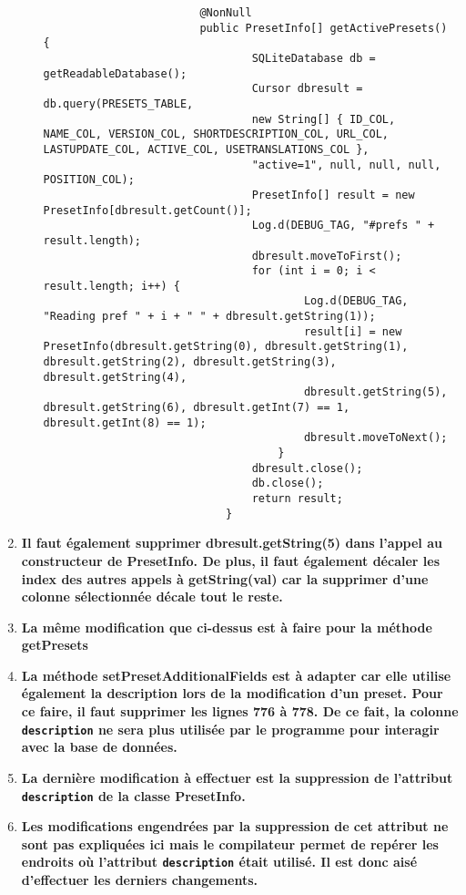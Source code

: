 \begin{enumerate}
\begin{itemize}
\begin{verbatim}
                        @NonNull
                        public PresetInfo[] getActivePresets() {
                                SQLiteDatabase db = getReadableDatabase();
                                Cursor dbresult = db.query(PRESETS_TABLE,
                                new String[] { ID_COL, NAME_COL, VERSION_COL, SHORTDESCRIPTION_COL, URL_COL, LASTUPDATE_COL, ACTIVE_COL, USETRANSLATIONS_COL },
                                "active=1", null, null, null, POSITION_COL);
                                PresetInfo[] result = new PresetInfo[dbresult.getCount()];
                                Log.d(DEBUG_TAG, "#prefs " + result.length);
                                dbresult.moveToFirst();
                                for (int i = 0; i < result.length; i++) {
                                        Log.d(DEBUG_TAG, "Reading pref " + i + " " + dbresult.getString(1));
                                        result[i] = new PresetInfo(dbresult.getString(0), dbresult.getString(1), dbresult.getString(2), dbresult.getString(3), dbresult.getString(4),
                                        dbresult.getString(5), dbresult.getString(6), dbresult.getInt(7) == 1, dbresult.getInt(8) == 1);
                                        dbresult.moveToNext();
                                    }
                                dbresult.close();
                                db.close();
                                return result;
                            }
                    \end{verbatim}
          \end{itemize}
    \item \textbf{Il faut également supprimer dbresult.getString(5) dans l'appel au constructeur de PresetInfo. De plus, il faut également décaler les index des autres appels à getString(val) car la supprimer d'une colonne sélectionnée décale tout le reste.}
    \item \textbf{La même modification que ci-dessus est à faire pour la méthode getPresets}

    \item \textbf{La méthode setPresetAdditionalFields est à adapter car elle utilise également la description lors de la modification d'un preset. Pour ce faire, il faut supprimer les lignes 776 à 778. De ce fait, la colonne \texttt{description} ne sera plus utilisée par le programme pour interagir avec la base de données.}

    \item \textbf{La dernière modification à effectuer est la suppression de l'attribut \texttt{description} de la classe PresetInfo.}

    \item \textbf{Les modifications engendrées par la suppression de cet attribut ne sont pas expliquées ici mais le compilateur permet de repérer les endroits où l'attribut \texttt{description} était utilisé. Il est donc aisé d'effectuer les derniers changements.}
\end{enumerate}
